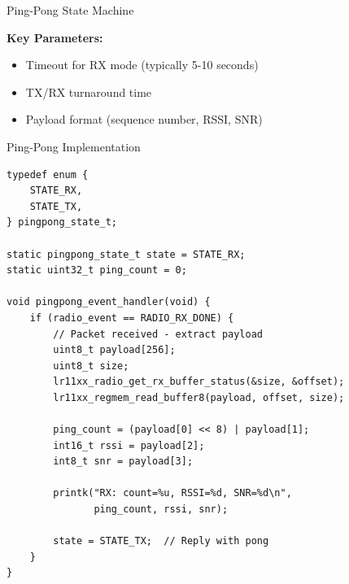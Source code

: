 \documentclass{beamer}
\begin{document}
\begin{frame}[fragile]{Ping-Pong State Machine}
\begin{center}
\end{center}

\vspace{0.3cm}

\textbf{Key Parameters:}
\begin{itemize}
    \item Timeout for RX mode (typically 5-10 seconds)
    \item TX/RX turnaround time
    \item Payload format (sequence number, RSSI, SNR)
\end{itemize}
\end{frame}

\begin{frame}[fragile]{Ping-Pong Implementation}
\begin{lstlisting}[caption={Ping-Pong Main Loop}]
typedef enum {
    STATE_RX,
    STATE_TX,
} pingpong_state_t;

static pingpong_state_t state = STATE_RX;
static uint32_t ping_count = 0;

void pingpong_event_handler(void) {
    if (radio_event == RADIO_RX_DONE) {
        // Packet received - extract payload
        uint8_t payload[256];
        uint8_t size;
        lr11xx_radio_get_rx_buffer_status(&size, &offset);
        lr11xx_regmem_read_buffer8(payload, offset, size);

        ping_count = (payload[0] << 8) | payload[1];
        int16_t rssi = payload[2];
        int8_t snr = payload[3];

        printk("RX: count=%u, RSSI=%d, SNR=%d\n",
               ping_count, rssi, snr);

        state = STATE_TX;  // Reply with pong
    }
}
\end{lstlisting}
\end{frame}
\end{document}
